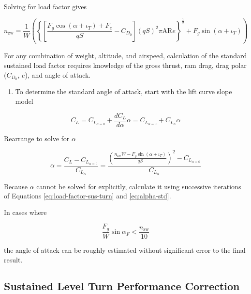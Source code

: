 \documentclass[
]{book}
\providecommand{\tightlist}{%
  \setlength{\itemsep}{0pt}\setlength{\parskip}{0pt}}
\begin{document}
Solving for load factor gives

\[
n_{\text{zw}} = \frac{1}{W}
      \left(
            \left\{
                  \left[
                        \frac{F_g \cos \left(\alpha + \iota_T \right)+F_e}
                             {qS} -
                        C_{D_0}
                  \right]
                  \left(
                        qS
                  \right)^2
                  \pi \mathrm{AR} e
            \right\}^{\frac{1}{2}} +
            F_g \sin \left(\alpha + \iota_T \right)
      \right)
\label{eq:load-factor-sus-turn}
\]

For any combination of weight, altitude, and airspeed, calculation of the
standard sustained load factor requires knowledge of the gross thrust, ram
drag, drag polar (\(C_{D_0},\,e\)), and angle of attack.

\begin{enumerate}
\def\labelenumi{\arabic{enumi}.}
\setcounter{enumi}{5}
\tightlist
\item
  To determine the standard angle of attack, start with the lift curve slope
  model
\end{enumerate}

\[
C_L = C_{L_{\alpha = 0}} + \frac{dC_L}{d\alpha} \alpha = C_{L_{\alpha = 0}} + C_{L_{\alpha}}\alpha
\]

Rearrange to solve for \(\alpha\)

\[
\alpha = \frac{C_L - C_{L_{\alpha = 0}}}{C_{L_{\alpha}}} =
      \frac{\left(
                  \frac{n_{\text{zw}}W - F_g \sin \left(\alpha + \iota_T \right)}
                       {qS}
            \right)^2 - C_{L_{\alpha = 0}}}
           {C_{L_{\alpha}}}
\label{eq:alpha-std}
\]

Because \(\alpha\) cannot be solved for explicitly, calculate it using
successive iterations of Equations \eqref{eq:load-factor-sus-turn} and \eqref{eq:alpha-std}.

In cases where

\[
\frac{F_g}{W} \sin \alpha_F  <  \frac{n_{\text{zw}}}{10}
\]

the angle of attack can be roughly estimated without significant error to the
final result.

\hypertarget{sustained-level-turn-performance-correction}{%
\subsection{Sustained Level Turn Performance Correction}\label{sustained-level-turn-performance-correction}}
\end{document}
